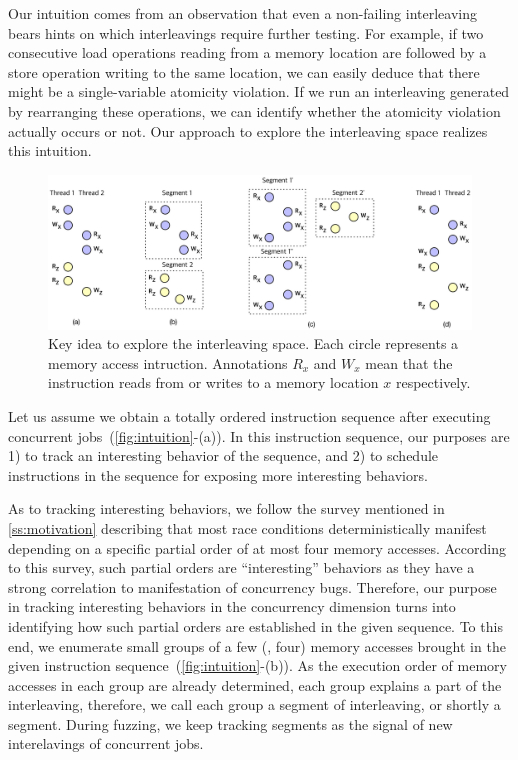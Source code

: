 Our intuition comes from an observation that even a non-failing
interleaving bears hints on which interleavings require further
testing.
%
For example, if two consecutive load operations reading from a memory
location are followed by a store operation writing to the same
location, we can easily deduce that there might be a single-variable
atomicity violation.
%
If we run an interleaving generated by rearranging these operations,
we can identify whether the atomicity violation actually occurs or
not.
%
Our approach to explore the interleaving space realizes this
intuition.


\begin{figure}[t]
  \includegraphics[width=0.9\linewidth]{fig/intuition.pdf}
  \caption{Key idea to explore the interleaving space. Each circle
    represents a memory access intruction. Annotations $R_x$ and $W_x$
    mean that the instruction reads from or writes to a memory
    location $x$ respectively.}
  \label{fig:intuition}
\end{figure}


%
Let us assume we obtain a totally ordered instruction sequence after
executing concurrent jobs~(\autoref{fig:intuition}-(a)).
%
In this instruction sequence, our purposes are 1) to track an
interesting behavior of the sequence, and 2) to schedule instructions
in the sequence for exposing more interesting behaviors.


As to tracking interesting behaviors, we follow the survey mentioned
in \autoref{ss:motivation} describing that most race conditions
deterministically manifest depending on a specific partial order of at
most four memory accesses.
%
According to this survey, such partial orders are ``interesting''
behaviors as they have a strong correlation to manifestation of
concurrency bugs.
%
Therefore, our purpose in tracking interesting behaviors in the
concurrency dimension turns into identifying how such partial orders
are established in the given sequence.
%
To this end, we enumerate small groups of a few (\eg, four) memory
accesses brought in the given instruction
sequence~(\autoref{fig:intuition}-(b)).
%
As the execution order of memory accesses in each group are already
determined, each group explains a part of the interleaving, therefore,
we call each group a segment of interleaving, or shortly a segment.
%
During fuzzing, we keep tracking segments as the signal of new
interelavings of concurrent jobs.





